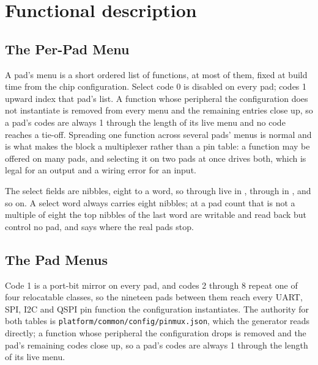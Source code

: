 \section{Functional description}

\subsection{The Per-Pad Menu}

A pad's menu is a short ordered list of functions, at most  of them, fixed at build time from the chip configuration. Select code 0 is disabled on every pad; codes 1 upward index that pad's list. A function whose peripheral the configuration does not instantiate is removed from every menu and the remaining entries close up, so a pad's codes are always 1 through the length of its live menu and no code reaches a tie-off. Spreading one function across several pads' menus is normal and is what makes the block a multiplexer rather than a pin table: a function may be offered on many pads, and selecting it on two pads at once drives both, which is legal for an output and a wiring error for an input.

The select fields are nibbles, eight to a word, so  through  live in ,  through  in , and so on. A select word always carries eight nibbles; at a pad count that is not a multiple of eight the top nibbles of the last word are writable and read back but control no pad, and  says where the real pads stop.

\subsection{The Pad Menus}

Code 1 is a  port-bit mirror on every pad, and codes 2 through 8 repeat one of four relocatable classes, so the nineteen pads between them reach every UART, SPI, I2C and QSPI pin function the configuration instantiates. The authority for both tables is \texttt{platform/common/config/pinmux.json}, which the generator reads directly; a function whose peripheral the configuration drops is removed and the pad's remaining codes close up, so a pad's codes are always 1 through the length of its live menu.

